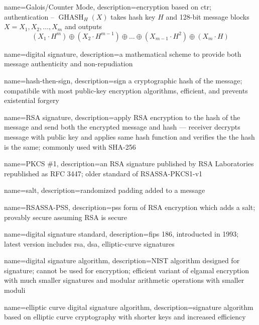 {
    name={Galois/Counter Mode},
    description={encryption based on \acrfull{ctr}; authentication -- $\operatorname{GHASH}_H(X)$ takes hash key $H$ and 128-bit message blocks $X = X_1, X_2, \dots, X_m$ and outputs \[(X_1\cdot H^m)\oplus(X_2\cdot H^{m-1})\oplus\dots\oplus(X_{m-1}\cdot H^2)\oplus(X_m\cdot H)\]}
}

{
    name={digital signature},
    description={a mathematical scheme to provide both message \gls{authenticity} and \gls{non-repudiation}}
}

{
    name={hash-then-sign},
    description={sign a cryptographic hash of the message; compatibile with most public-key encryption algorithms, efficient, and prevents existential forgery}
}

{
    name={RSA signature},
    description={apply RSA encryption to the hash of the message and send both the encrypted message and hash --- receiver decrypts message with public key and applies same hash function and verifies the the hash is the same; commonly used with SHA-256}
}

{
    name={PKCS \#1},
    description={an RSA signature published by RSA Laboratories republished as RFC 3447; older standard of RSASSA-PKCS1-v1}
}

{
    name={salt},
    description={randomized padding added to a message}
}

{
    name={RSASSA-PSS},
    description={\acrfull{pss} form of RSA encryption which adds a \gls{salt}; provably secure assuming RSA is secure}
}

{
    name={digital signature standard},
    description={\acrfull{fips} 186, introducted in 1993; latest version includes \acrshort{rsa}, \acrshort{dsa}, elliptic-curve signatures}
}

{
    name={digital signature algorithm},
    description={NIST algorithm designed for signature; cannot be used for encryption; efficient variant of \gls{elgamal encryption} with much smaller signatures and modular arithmetic operations with smaller moduli}
}

{
    name={elliptic curve digital signature algorithm},
    description={signature algorithm based on elliptic curve cryptography with shorter keys and increased efficiency}
}

